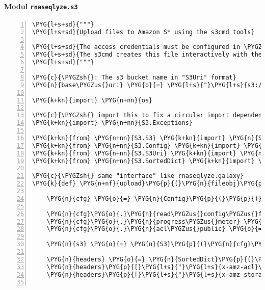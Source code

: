 \paragraph{Modul \texttt{rnaseqlyze.s3}}
\label{rnaseqlyze-pdf:modul-rnaseqlyze-s3}
\begin{Verbatim}[commandchars=\\\{\},numbers=left,firstnumber=1,stepnumber=5]
\PYG{l+s+sd}{"""}
\PYG{l+s+sd}{Upload files to Amazon S* using the s3cmd tools}

\PYG{l+s+sd}{The access credentials must be configured in \PYGZti{}/.s3cfg .}
\PYG{l+s+sd}{The s3cmd creates this file interactively with the --configure option.}
\PYG{l+s+sd}{"""}

\PYG{c}{\PYGZsh{}: The s3 bucket name in "S3Uri" format}
\PYG{n}{base\PYGZus{}uri} \PYG{o}{=} \PYG{l+s}{"}\PYG{l+s}{s3://biocalc/}\PYG{l+s}{"}

\PYG{k+kn}{import} \PYG{n+nn}{os}

\PYG{c}{\PYGZsh{} import this to fix a circular import dependency problem in s3cmd ...}
\PYG{k+kn}{import} \PYG{n+nn}{S3.Exceptions}

\PYG{k+kn}{from} \PYG{n+nn}{S3.S3} \PYG{k+kn}{import} \PYG{n}{S3}
\PYG{k+kn}{from} \PYG{n+nn}{S3.Config} \PYG{k+kn}{import} \PYG{n}{Config}
\PYG{k+kn}{from} \PYG{n+nn}{S3.S3Uri} \PYG{k+kn}{import} \PYG{n}{S3Uri}
\PYG{k+kn}{from} \PYG{n+nn}{S3.SortedDict} \PYG{k+kn}{import} \PYG{n}{SortedDict}

\PYG{c}{\PYGZsh{} same "interface" like rnaseqlyze.galaxy}
\PYG{k}{def} \PYG{n+nf}{upload}\PYG{p}{(}\PYG{n}{fileobj}\PYG{p}{,} \PYG{n}{filename}\PYG{p}{)}\PYG{p}{:}

    \PYG{n}{cfg} \PYG{o}{=} \PYG{n}{Config}\PYG{p}{(}\PYG{p}{)}

    \PYG{n}{cfg}\PYG{o}{.}\PYG{n}{read\PYGZus{}config\PYGZus{}file}\PYG{p}{(}\PYG{n}{os}\PYG{o}{.}\PYG{n}{path}\PYG{o}{.}\PYG{n}{join}\PYG{p}{(}\PYG{n}{os}\PYG{o}{.}\PYG{n}{getenv}\PYG{p}{(}\PYG{l+s}{"}\PYG{l+s}{HOME}\PYG{l+s}{"}\PYG{p}{)}\PYG{p}{,} \PYG{l+s}{"}\PYG{l+s}{.s3cfg}\PYG{l+s}{"}\PYG{p}{)}\PYG{p}{)}
    \PYG{n}{cfg}\PYG{o}{.}\PYG{n}{progress\PYGZus{}meter} \PYG{o}{=} \PYG{n+nb+bp}{False}
    \PYG{n}{cfg}\PYG{o}{.}\PYG{n}{acl\PYGZus{}public} \PYG{o}{=} \PYG{n+nb+bp}{True}

    \PYG{n}{s3} \PYG{o}{=} \PYG{n}{S3}\PYG{p}{(}\PYG{n}{cfg}\PYG{p}{)}

    \PYG{n}{headers} \PYG{o}{=} \PYG{n}{SortedDict}\PYG{p}{(}\PYG{n}{ignore\PYGZus{}case} \PYG{o}{=} \PYG{n+nb+bp}{True}\PYG{p}{)}
    \PYG{n}{headers}\PYG{p}{[}\PYG{l+s}{"}\PYG{l+s}{x-amz-acl}\PYG{l+s}{"}\PYG{p}{]} \PYG{o}{=} \PYG{l+s}{"}\PYG{l+s}{public-read}\PYG{l+s}{"}
    \PYG{n}{headers}\PYG{p}{[}\PYG{l+s}{"}\PYG{l+s}{x-amz-storage-class}\PYG{l+s}{"}\PYG{p}{]} \PYG{o}{=} \PYG{l+s}{"}\PYG{l+s}{REDUCED\PYGZus{}REDUNDANCY}\PYG{l+s}{"}


\end{Verbatim}
